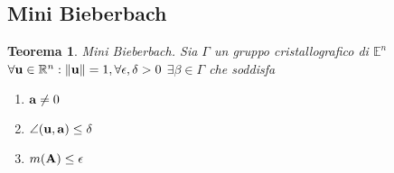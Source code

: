 \documentclass[10pt,a4paper]{article}
\newtheorem{theorem}{Teorema}[section]
\begin{document}
\subsection{Mini Bieberbach} 
\begin{theorem}{Mini Bieberbach.}
Sia $\Gamma$ un gruppo cristallografico di $\mathbb{E}^n$ \\
$ \forall \vb{u} \in \mathbb{R}^n : \norm{\vb{u}} = 1,   \forall \epsilon , \delta >0 $ \hfill  $   \exists \beta \in \Gamma $ che soddisfa \hfill
\begin{minipage}{0.3\textwidth} 
\begin{enumerate}
\item $\vb{a} \neq 0$ 
\item $ \angle (\vb{u, a}) \leq \delta $
\item $ m(\vb{A}) \leq \epsilon$ 
\end{enumerate}
\end{minipage}
\end{theorem}
\end{document}

